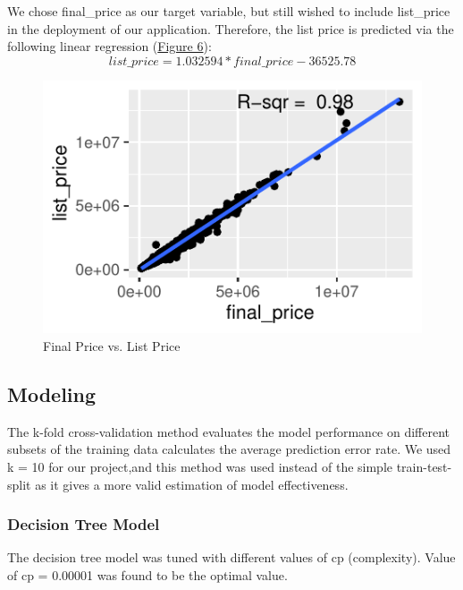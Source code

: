 \documentclass[11pt,]{article}
\begin{document}
We chose final\_price as our target variable, but still wished to
include list\_price in the deployment of our application. Therefore, the
list price is predicted via the following linear regression
(\hyperref[sec:fig6]{Figure 6}):
\[list\_price = 1.032594 * final\_price - 36525.78\]

\begin{figure}

{\centering \includegraphics{House_prices_report_files/figure-latex/final list-1} 

}

\caption{Final Price vs. List Price\label{sec:fig6}}\label{fig:final list}
\end{figure}
\newpage

\hypertarget{modeling-1}{%
\subsection{Modeling}\label{modeling-1}}

The k-fold cross-validation method evaluates the model performance on
different subsets of the training data calculates the average prediction
error rate. We used k = 10 for our project,and this method was used
instead of the simple train-test-split as it gives a more valid
estimation of model effectiveness.

\hypertarget{decision-tree-model}{%
\subsubsection{Decision Tree Model}\label{decision-tree-model}}

The decision tree model was tuned with different values of cp
(complexity). Value of cp = 0.00001 was found to be the optimal value.
\end{document}
